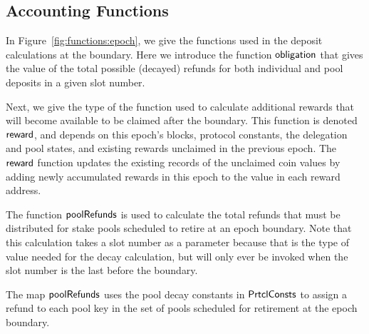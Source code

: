 \subsection{Accounting Functions}
\label{sec:acc-fun}

In Figure~\ref{fig:functions:epoch}, we give the functions used in the deposit
calculations at the boundary. Here we introduce the function $\mathsf{obligation}$
that gives the value of the total possible (decayed) refunds for both individual
and pool deposits in a given slot number.

Next, we give the type of the function used to calculate additional rewards that
will become available to be claimed after the boundary. This function is denoted
$\mathsf{reward}$, and depends on this epoch's blocks, protocol constants, the
delegation and pool states, and existing rewards unclaimed in the previous
epoch.  The $\mathsf{reward}$ function updates the existing records of the
unclaimed coin values by adding newly accumulated rewards in this epoch to the
value in each reward address.

The function $\mathsf{poolRefunds}$ is used to calculate the total refunds
that must be distributed
for stake pools scheduled to retire at an epoch boundary. Note that this
calculation takes a slot number as a parameter because that is the type of value
needed for the decay calculation, but will only ever be invoked
when the slot number is the last before the boundary.

The map $\mathsf{poolRefunds}$ uses the pool decay constants in $\mathsf{PrtclConsts}$
to assign a refund to each pool key in the set of pools scheduled for retirement
at the epoch boundary.


